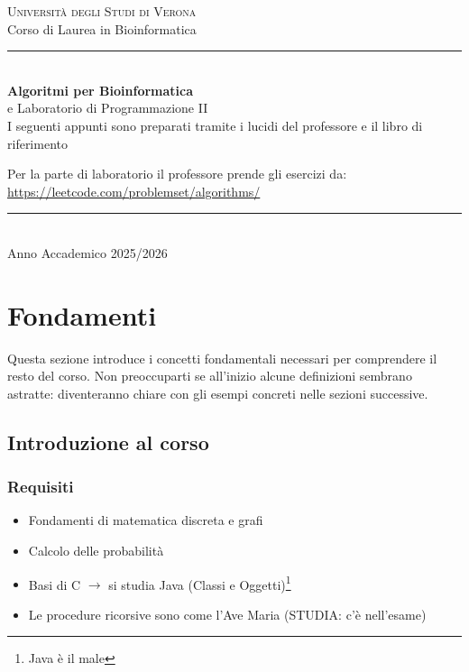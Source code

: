 \documentclass[a4paper, 11pt]{article}
\theoremstyle{definition}
\theoremstyle{remark}
\theoremstyle{remark}
\begin{document}
	\begin{titlepage}
		\centering
		\vspace*{3cm}
		{\large\scshape\color{primary} Università degli Studi di Verona}\\[0.3cm]
		{\large\color{black} Corso di Laurea in Bioinformatica}\\[0.2cm]
		\textcolor{primary}{\rule{\textwidth}{0.4pt}}\\[1.5cm]
		{\Huge\bfseries\color{primary} Algoritmi per Bioinformatica}\\[0.5cm]
		{\LARGE\color{black} e Laboratorio di Programmazione II}\\[2cm]
		\vfill
		{\large\color{black} I seguenti appunti sono preparati tramite i lucidi del professore e il libro di riferimento}
		
		{\large\color{black}} Per la parte di laboratorio il professore prende gli esercizi da:
		\url{https://leetcode.com/problemset/algorithms/}
		\textcolor{primary}{\rule{\textwidth}{0.4pt}}\\[0.5cm]
		{\large\color{black} Anno Accademico 2025/2026}
		
		
	\end{titlepage}
	\clearpage
	\tableofcontents
	\clearpage
	\section{Fondamenti}
	
	\begin{softnote}
		Questa sezione introduce i concetti fondamentali necessari per comprendere il resto del corso. Non preoccuparti se all'inizio alcune definizioni sembrano astratte: diventeranno chiare con gli esempi concreti nelle sezioni successive.
	\end{softnote}
	
	\subsection{Introduzione al corso}
	
	\subsubsection{Requisiti}
	\begin{itemize}
		\item Fondamenti di matematica discreta e grafi
		\item Calcolo delle probabilità
		\item Basi di C $\to$ si studia Java (Classi e Oggetti)\footnote{Java è il male}
		\item Le procedure ricorsive sono come l'Ave Maria (STUDIA: c'è nell'esame)
	\end{itemize}
	
\end{document}
